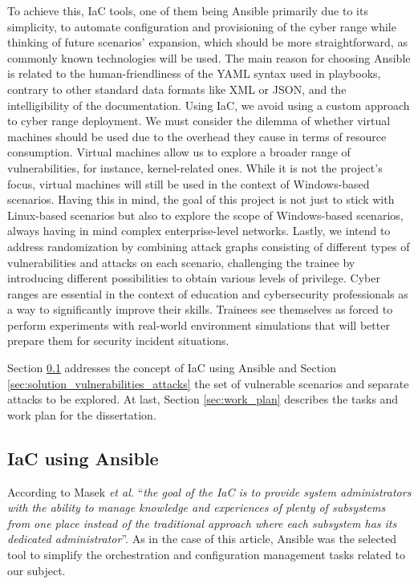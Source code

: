 To achieve this, IaC tools, one of them being Ansible primarily due to its simplicity, to automate configuration and provisioning of the cyber range while thinking of future scenarios' expansion, which should be more straightforward, as commonly known technologies will be used. The main reason for choosing Ansible is related to the human-friendliness of the YAML syntax used in playbooks, contrary to other standard data formats like XML or JSON, and the intelligibility of the documentation. Using IaC, we avoid using a custom approach to cyber range deployment. We must consider the dilemma of whether virtual machines should be used due to the overhead they cause in terms of resource consumption. Virtual machines allow us to explore a broader range of vulnerabilities, for instance, kernel-related ones. While it is not the project's focus, virtual machines will still be used in the context of Windows-based scenarios. Having this in mind, the goal of this project is not just to stick with Linux-based scenarios but also to explore the scope of Windows-based scenarios, always having in mind complex enterprise-level networks. Lastly, we intend to address randomization by combining attack graphs consisting of different types of vulnerabilities and attacks on each scenario, challenging the trainee by introducing different possibilities to obtain various levels of privilege. Cyber ranges are essential in the context of education and cybersecurity professionals as a way to significantly improve their skills. Trainees see themselves as forced to perform experiments with real-world environment simulations that will better prepare them for security incident situations.

Section \ref{sec:solution_iac_ansible} addresses the concept of IaC using Ansible and Section \ref{sec:solution_vulnerabilities_attacks} the set of vulnerable scenarios and separate attacks to be explored. At last, Section \ref{sec:work_plan} describes the tasks and work plan for the dissertation.

\subsection{IaC using Ansible} \label{sec:solution_iac_ansible}

According to Masek \textit{et al.} \cite{unleashing_full_potential_of_ansible_ref} ``\textit{the goal of the IaC is to provide system administrators with the ability to manage knowledge and experiences of plenty of subsystems from one place instead of the traditional approach where each subsystem has its dedicated administrator}''. As in the case of this article, Ansible was the selected tool to simplify the orchestration and configuration management tasks related to our subject. 

